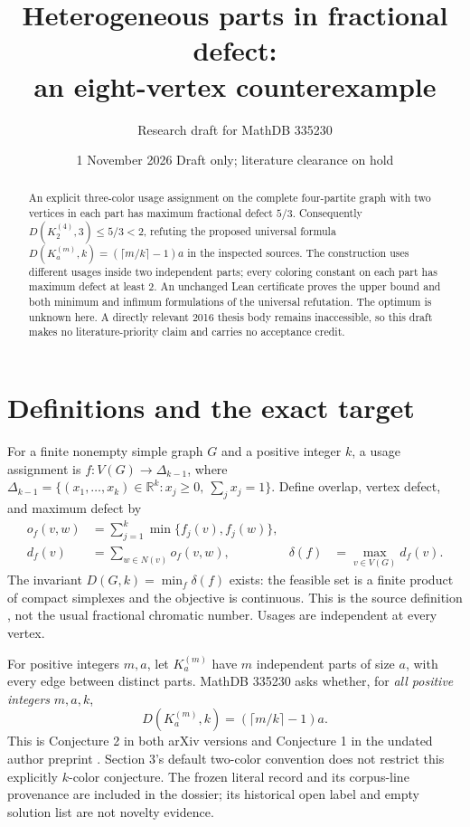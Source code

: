\documentclass[11pt]{article}
\title{Heterogeneous parts in fractional defect:\\an eight-vertex counterexample}
\author{Research draft for MathDB 335230}
\date{1 November 2026 \quad Draft only; literature clearance on hold}
\begin{document}
\maketitle
\begin{abstract}
An explicit three-color usage assignment on the complete four-partite graph
with two vertices in each part has maximum fractional defect $5/3$.
Consequently $D(K_2^{(4)},3)\leq 5/3<2$, refuting the proposed universal
formula $D(K_a^{(m)},k)=(\lceil m/k\rceil-1)a$ in the inspected sources.
The construction uses different usages inside two independent parts; every
coloring constant on each part has maximum defect at least $2$.
An unchanged Lean certificate proves the upper bound and both minimum and
infimum formulations of the universal refutation. The optimum is unknown
here. A directly relevant 2016 thesis body remains inaccessible, so this
draft makes no literature-priority claim and carries no acceptance credit.
\end{abstract}

\section{Definitions and the exact target}
For a finite nonempty simple graph $G$ and a positive integer $k$, a usage assignment is
$f:V(G)\to\Delta_{k-1}$, where
$\Delta_{k-1}=\{(x_1,\ldots,x_k)\in\mathbb R^k:x_j\geq0,\ \sum_jx_j=1\}$.
Define overlap, vertex defect, and maximum defect by
\begin{align*}
 o_f(v,w)&=\sum_{j=1}^k\min\{f_j(v),f_j(w)\},\\
 d_f(v)&=\sum_{w\in N(v)}o_f(v,w),&
 \delta(f)&=\max_{v\in V(G)}d_f(v).
\end{align*}
The invariant $D(G,k)=\min_f\delta(f)$ exists: the feasible set is a finite
product of compact simplexes and the objective is continuous. This is the
source definition \cite[Section 2, equation (1)]{v2}, not the usual
fractional chromatic number. Usages are independent at every vertex.

For positive integers $m,a$, let $K_a^{(m)}$ have $m$ independent parts of size
$a$, with every edge between distinct parts. MathDB 335230 asks whether,
for \emph{all positive integers} $m,a,k$,
\begin{equation}\label{conj}
 D(K_a^{(m)},k)=(\lceil m/k\rceil-1)a.
\end{equation}
This is Conjecture 2 in both arXiv versions \cite{v1,v2} and Conjecture 1
in the undated author preprint \cite{author}. Section 3's default two-color
convention does not restrict this explicitly $k$-color conjecture.
The frozen literal record and its corpus-line provenance are included in the dossier;
its historical open label and empty solution list are not novelty evidence.
\end{document}
